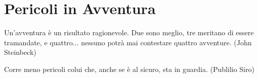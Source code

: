 \section{Pericoli in Avventura}

\begin{changemargin}{0.3cm}{0.3cm}\begin{enfasi}{
Un'avventura è un risultato ragionevole. Due sono meglio, tre meritano di essere tramandate, e quattro... nessuno potrà mai contestare quattro avventure. (John Steinbeck)

\medskip

Corre meno pericoli colui che, anche se è al sicuro, sta in guardia. (Publilio Siro)} \end{enfasi}\end{changemargin}\medskip

\label{pericoli-in-avventura}

